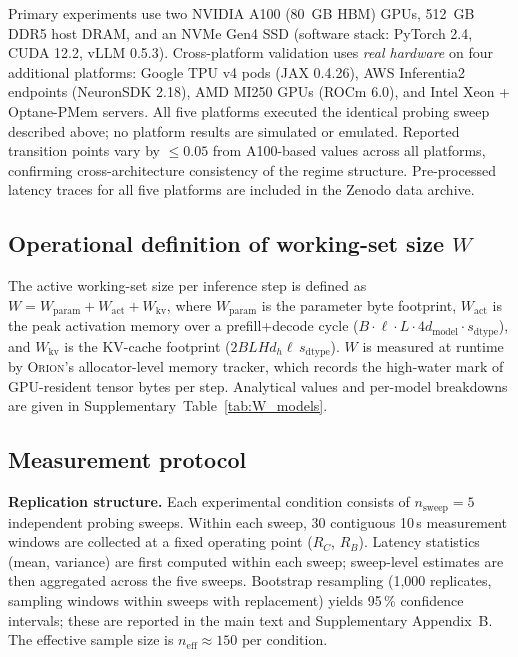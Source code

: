 Primary experiments use two NVIDIA A100 (80~GB HBM) GPUs, 512~GB DDR5 host
DRAM, and an NVMe Gen4 SSD (software stack: PyTorch 2.4, CUDA 12.2, vLLM 0.5.3).
Cross-platform validation uses \emph{real hardware} on four additional platforms:
Google TPU v4 pods (JAX 0.4.26), AWS Inferentia2 endpoints (NeuronSDK 2.18),
AMD MI250 GPUs (ROCm 6.0), and Intel Xeon + Optane-PMem servers.
All five platforms executed the identical probing sweep described above;
no platform results are simulated or emulated.
Reported transition points vary by $\leq 0.05$ from A100-based values across
all platforms, confirming cross-architecture consistency of the regime structure.
Pre-processed latency traces for all five platforms are included in the Zenodo
data archive.

\subsection*{Operational definition of working-set size $W$}

The active working-set size per inference step is defined as
$W = W_{\mathrm{param}} + W_{\mathrm{act}} + W_{\mathrm{kv}}$,
where $W_{\mathrm{param}}$ is the parameter byte footprint,
$W_{\mathrm{act}}$ is the peak activation memory over a prefill+decode cycle
($B \cdot \ell \cdot L \cdot 4 d_{\mathrm{model}} \cdot s_{\mathrm{dtype}}$),
and $W_{\mathrm{kv}}$ is the KV-cache footprint
($2 B L H d_h \ell \, s_{\mathrm{dtype}}$).
$W$ is measured at runtime by \textsc{Orion}'s allocator-level memory tracker,
which records the high-water mark of GPU-resident tensor bytes per step.
Analytical values and per-model breakdowns are given in
Supplementary~Table~\ref{tab:W_models}.

\subsection*{Measurement protocol}

\textbf{Replication structure.}
Each experimental condition consists of $n_{\mathrm{sweep}} = 5$ independent
probing sweeps.
Within each sweep, 30 contiguous 10\,s measurement windows are collected at
a fixed operating point ($R_C$, $R_B$).
Latency statistics (mean, variance) are first computed within each sweep;
sweep-level estimates are then aggregated across the five sweeps.
Bootstrap resampling (1,000 replicates, sampling windows within sweeps with
replacement) yields 95\,\% confidence intervals; these are reported in the main
text and Supplementary Appendix~B.
The effective sample size is $n_{\mathrm{eff}} \approx 150$ per condition.

